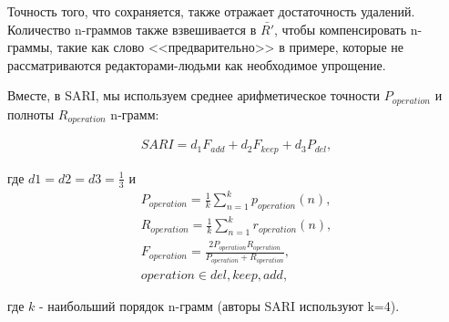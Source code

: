 Точность того, что сохраняется, также отражает достаточность удалений. Количество n-граммов также взвешивается в $\bar{R'}$, чтобы компенсировать n-граммы, такие как слово <<предварительно>> в примере, которые не рассматриваются редакторами-людьми как необходимое упрощение.

Вместе, в SARI, мы используем среднее арифметическое точности $P_{operation}$ и полноты $R_{operation}$ n-грамм:

\begin{eqnarray} 
	\label{eq:13}
	SARI = d_{1}F_{add} + d_{2}F_{keep} + d_{3}P_{del} ,
\end{eqnarray}

где $d1 = d2 = d3 = \frac{1}{3}$ и 
\begin{eqnarray} 
	\label{eq:14}
	P_{operation} = \frac{1}{k}\sum\limits_{n=1}^{k}p_{operation}(n) ,\\
	R_{operation} = \frac{1}{k}\sum\limits_{n=1}^{k}r_{operation}(n) ,\\
	F_{operation} = \frac{2P_{operation}R_{operation}}{P_{operation} + R_{operation}},  \\
	operation\in{del, keep, add} ,
\end{eqnarray}

где $k$ - наибольший порядок n-грамм (авторы SARI используют k=4).
